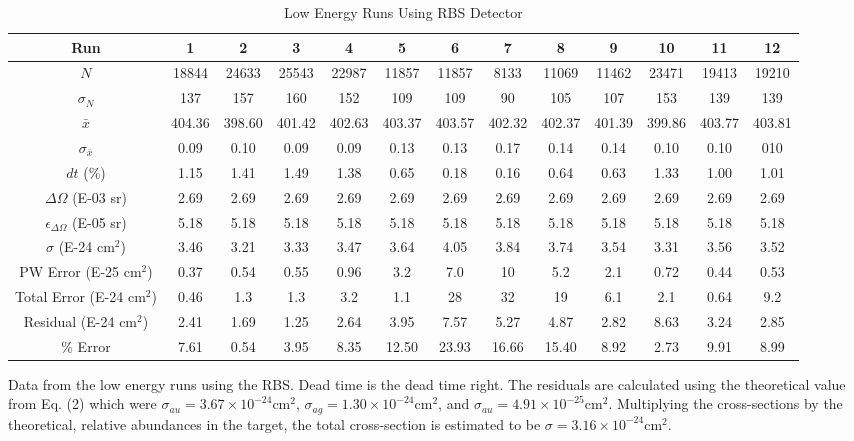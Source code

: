 \documentclass[10pt]{IEEEtran}
\begin{document}
    \begin{table}[!hbt]
        \begin{center}
        \caption{Low Energy Runs Using RBS Detector}
        \label{tab:lowRBS}
        \begin{tabular}{|c|cccccccccccc|}
            \hline
		   Run & 1 & 2 & 3 & 4 & 5 & 6 & 7 & 8 & 9 & 10 & 11 & 12 \\ 
		   \hline      \hline      
            $N$ & 18844 & 24633 & 25543 & 22987 & 11857 & 11857 & 8133 & 11069 & 11462 & 23471 & 19413 & 19210 \\
		   \hline  
            $\sigma_N$ & 137 & 157 & 160 & 152 & 109 & 109 & 90 & 105 & 107 & 153 & 139 & 139 \\
            \hline
            $\bar{x}$ & 404.36 & 398.60 & 401.42 & 402.63 & 403.37 & 403.57 & 402.32 & 402.37 & 401.39 & 399.86 & 403.77 & 403.81 \\
            \hline
            $\sigma_{\bar{x}}$ & 0.09 & 0.10 & 0.09 & 0.09 & 0.13 &  0.13 & 0.17 & 0.14 & 0.14 & 0.10 & 0.10 & 010 \\
		   \hline            
            $dt$ (\%) & 1.15 & 1.41 & 1.49 & 1.38 & 0.65 & 0.18 & 0.16 & 0.64 & 0.63 & 1.33 & 1.00 & 1.01 \\
            \hline
		   $\Delta\Omega$ (E-03 sr) & 2.69 & 2.69 & 2.69 & 2.69 & 2.69 & 2.69 & 2.69 & 2.69 & 2.69 & 2.69 & 2.69 & 2.69 \\
		   \hline
		   $\epsilon_{\Delta\Omega}$ (E-05 sr) & 5.18 & 5.18 & 5.18 & 5.18 & 5.18 & 5.18 & 5.18 & 5.18 & 5.18 & 5.18 & 5.18 & 5.18 \\
		   \hline
		   $\sigma$ (E-24 cm$^2$) & 3.46 & 3.21 & 3.33 & 3.47 & 3.64 & 4.05 & 3.84 & 3.74 & 3.54 & 3.31 & 3.56 & 3.52 \\
		   \hline
		   PW Error (E-25 cm$^2$) & 0.37 & 0.54 & 0.55 & 0.96 & 3.2 & 7.0 & 10 & 5.2 & 2.1 & 0.72 & 0.44 & 0.53 \\
		   \hline
		   Total Error (E-24 cm$^2$) & 0.46 & 1.3 & 1.3 & 3.2 & 1.1 & 28 & 32 & 19 & 6.1 & 2.1 & 0.64 & 9.2 \\
		   \hline
		   Residual (E-24 cm$^2$) & 2.41 & 1.69 & 1.25 & 2.64 & 3.95 & 7.57 & 5.27 & 4.87 & 2.82 & 8.63 & 3.24 & 2.85 \\
		   \hline
		   \% Error & 7.61 & 0.54 & 3.95 & 8.35 & 12.50 & 23.93 & 16.66 & 15.40 & 8.92 & 2.73 & 9.91 & 8.99 \\
		   \hline
        \end{tabular}
        \end{center}
        Data from the low energy runs using the RBS. Dead time is the dead time right. The residuals are calculated using the theoretical value from Eq. (2) which were $\sigma_{au} = 3.67\times10^{-24}$cm$^2$, $\sigma_{ag} = 1.30\times10^{-24}$cm$^2$, and $\sigma_{au} = 4.91\times10^{-25}$cm$^2$.  Multiplying the cross-sections by the theoretical, relative abundances in the target, the total cross-section is estimated to be $\sigma = 3.16\times10^{-24}$cm$^2$.
    \end{table}    
    
\end{document}
